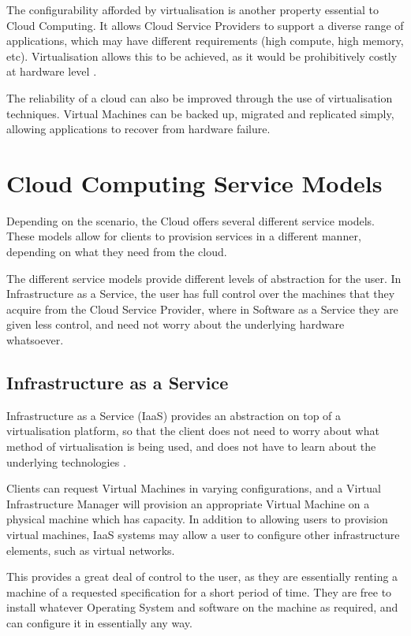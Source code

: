 The configurability afforded by virtualisation is another property essential to Cloud Computing. It allows Cloud Service Providers to support a diverse range of applications, which may have different requirements (high compute, high memory, etc). Virtualisation allows this to be achieved, as it would be prohibitively costly at hardware level \cite{foster2008cloud}. 

The reliability of a cloud can also be improved through the use of virtualisation techniques. Virtual Machines can be backed up, migrated and replicated simply, allowing applications to recover from hardware failure. 

\section{Cloud Computing Service Models}
Depending on the scenario, the Cloud offers several different service models. These models allow for clients to provision services in a different manner, depending on what they need from the cloud.

The different service models provide different levels of abstraction for the user. In Infrastructure as a Service, the user has full control over the machines that they acquire from the Cloud Service Provider, where in Software as a Service they are given less control, and need not worry about the underlying hardware whatsoever.

\subsection{Infrastructure as a Service}
Infrastructure as a Service (IaaS) provides an abstraction on top of a virtualisation platform, so that the client does not need to worry about what method of virtualisation is being used, and does not have to learn about the underlying technologies \cite{amies2012}.

Clients can request Virtual Machines in varying configurations, and a Virtual Infrastructure Manager will provision an appropriate Virtual Machine on a physical machine which has capacity. In addition to allowing users to provision virtual machines, IaaS systems may allow a user to configure other infrastructure elements, such as virtual networks. 

This provides a great deal of control to the user, as they are essentially renting a machine of a requested specification for a short period of time. They are free to install whatever Operating System and software on the machine as required, and can configure it in essentially any way. 

